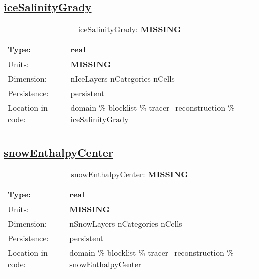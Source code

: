 \subsection[iceSalinityGrady]{\hyperref[sec:var_tab_tracer_reconstruction]{iceSalinityGrady}}
\label{subsec:var_sec_tracer_reconstruction_iceSalinityGrady}
\begin{center}
\begin{longtable}{| p{2.0in} | p{4.0in} |}
        \hline 
        Type: & real \\
        \hline 
        Units: & {\bf \color{red} MISSING} \\
        \hline 
        Dimension: & nIceLayers nCategories nCells \\
        \hline 
        Persistence: & persistent \\
        \hline 
         Location in code: & domain \% blocklist \% tracer\_reconstruction \% iceSalinityGrady \\
         \hline 
    \caption{iceSalinityGrady: {\bf \color{red} MISSING}}
\end{longtable}
\end{center}
\subsection[snowEnthalpyCenter]{\hyperref[sec:var_tab_tracer_reconstruction]{snowEnthalpyCenter}}
\label{subsec:var_sec_tracer_reconstruction_snowEnthalpyCenter}
\begin{center}
\begin{longtable}{| p{2.0in} | p{4.0in} |}
        \hline 
        Type: & real \\
        \hline 
        Units: & {\bf \color{red} MISSING} \\
        \hline 
        Dimension: & nSnowLayers nCategories nCells \\
        \hline 
        Persistence: & persistent \\
        \hline 
         Location in code: & domain \% blocklist \% tracer\_reconstruction \% snowEnthalpyCenter \\
         \hline 
    \caption{snowEnthalpyCenter: {\bf \color{red} MISSING}}
\end{longtable}
\end{center}
